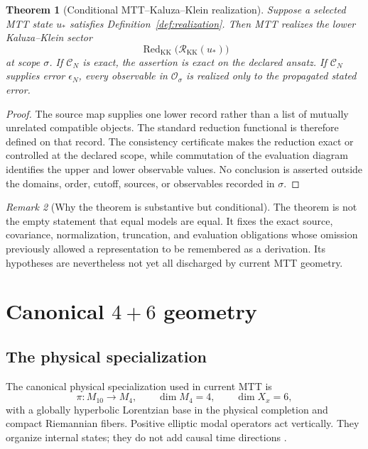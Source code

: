 \documentclass[11pt]{article}
\newtheorem{theorem}{Theorem}[section]
\theoremstyle{definition}
\theoremstyle{remark}
\newtheorem{remark}[theorem]{Remark}
\newcommand{\cC}{\mathcal C}
\newcommand{\cO}{\mathcal O}
\newcommand{\cR}{\mathcal R}
\begin{document}
\begin{theorem}[Conditional MTT--Kaluza--Klein realization]
\label{thm:conditional}
Suppose a selected MTT state \(u_\ast\) satisfies
Definition~\ref{def:realization}.  Then MTT realizes the lower
Kaluza--Klein sector
\[
 \operatorname{Red}_{\mathrm{KK}}
 \bigl(\cR_{\mathrm{KK}}(u_\ast)\bigr)
\]
at scope \(\sigma\).  If \(\cC_N\) is exact, the assertion is exact on the
declared ansatz.  If \(\cC_N\) supplies error \(\epsilon_N\), every observable
in \(\cO_\sigma\) is realized only to the propagated stated error.
\end{theorem}

\begin{proof}
The source map supplies one lower record rather than a list of mutually
unrelated compatible objects.  The standard reduction functional is
therefore defined on that record.  The consistency certificate makes the
reduction exact or controlled at the declared scope, while commutation of
the evaluation diagram identifies the upper and lower observable values.
No conclusion is asserted outside the domains, order, cutoff, sources, or
observables recorded in \(\sigma\).
\end{proof}

\begin{remark}[Why the theorem is substantive but conditional]
The theorem is not the empty statement that equal models are equal.  It
fixes the exact source, covariance, normalization, truncation, and evaluation
obligations whose omission previously allowed a representation to be
remembered as a derivation.  Its hypotheses are nevertheless not yet all
discharged by current MTT geometry.
\end{remark}

\section{Canonical \(4+6\) geometry}
\label{sec:fourplus}

\subsection{The physical specialization}

The canonical physical specialization used in current MTT is
\[
  \pi:M_{10}\longrightarrow M_4,
  \qquad \dim M_4=4,\qquad \dim X_x=6,
\]
with a globally hyperbolic Lorentzian base in the physical completion and
compact Riemannian fibers.  Positive elliptic modal operators act
vertically.  They organize internal states; they do not add causal time
directions \cite{NeroFoundation}.
\end{document}
